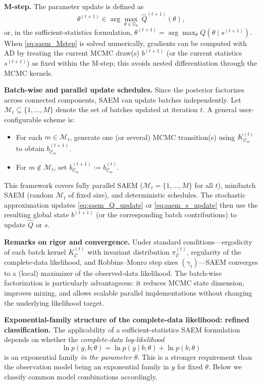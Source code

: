\documentclass[12pt]{article}
\begin{document}
\textbf{M-step.}
The parameter update is defined as
\begin{equation}
\label{eq:saem_Mstep}
\theta^{(t+1)} \in \arg\max_{\theta\in\mathbb{D}_\theta}\ \widehat Q^{(t+1)}(\theta),
\end{equation}
or, in the sufficient-statistics formulation, \(\theta^{(t+1)} = \arg\max_{\theta} Q(\theta\mid s^{(t+1)})\).
When \eqref{eq:saem_Mstep} is solved numerically, gradients can be computed with AD by treating the current MCMC draw(s) \(b^{(t+1)}\) (or the current statistics \(s^{(t+1)}\)) as fixed within the M-step; this avoids nested differentiation through the MCMC kernels.

\textbf{Batch-wise and parallel update schedules.}
Since the posterior factorizes across connected components, SAEM can update batches independently. Let \(\mathcal{M}_t\subseteq\{1,\dots,M\}\) denote the set of batches updated at iteration \(t\). A general user-configurable scheme is:
\begin{itemize}
\item For each \(m\in \mathcal{M}_t\), generate one (or several) MCMC transition(s) using \(K_{\mathcal{C}_m}^{(t)}\) to obtain \(b_{\mathcal{C}_m}^{(t+1)}\).
\item For \(m\notin \mathcal{M}_t\), set \(b_{\mathcal{C}_m}^{(t+1)}:=b_{\mathcal{C}_m}^{(t)}\).
\end{itemize}
This framework covers fully parallel SAEM (\(\mathcal{M}_t=\{1,\dots,M\}\) for all \(t\)), minibatch SAEM (random \(\mathcal{M}_t\) of fixed size), and deterministic schedules. The stochastic approximation updates \eqref{eq:saem_Q_update} or \eqref{eq:saem_s_update} then use the resulting global state \(b^{(t+1)}\) (or the corresponding batch contributions) to update \(\widehat Q\) or \(s\).

\textbf{Remarks on rigor and convergence.}
Under standard conditions---ergodicity of each batch kernel \(K_{\mathcal{C}}^{(t)}\) with invariant distribution \(\pi_{\mathcal{C}}^{(t)}\), regularity of the complete-data likelihood, and Robbins--Monro step sizes \((\gamma_t)\)---SAEM converges to a (local) maximizer of the observed-data likelihood. The batch-wise factorization is particularly advantageous: it reduces MCMC state dimension, improves mixing, and allows scalable parallel implementations without changing the underlying likelihood target.

\textbf{Exponential-family structure of the complete-data likelihood: refined classification.}
The applicability of a sufficient-statistics SAEM formulation depends on whether the
\emph{complete-data log-likelihood}
\[
\ln p(y,b;\theta)=\ln p(y\mid b;\theta)+\ln p(b;\theta)
\]
is an exponential family \emph{in the parameter \(\theta\)}.  
This is a stronger requirement than the observation model being an exponential family in \(y\) for fixed \(\theta\).
Below we classify common model combinations accordingly.
\end{document}

